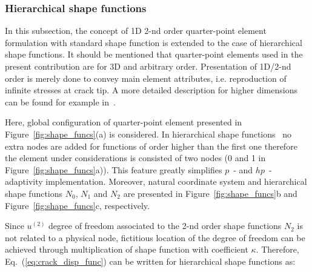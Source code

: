 \documentclass[11pt]{acmeArticle}
\numberwithin{equation}{section}
\begin{document}
\subsubsection{Hierarchical shape functions}
In this subsection, the concept of 1D 2-nd order quarter-point element formulation with standard shape function is extended to the case of hierarchical shape functions.
It should be mentioned that quarter-point elements used in the present contribution are for 3D and arbitrary order.
Presentation of 1D/2-nd order is merely done to convey main element attributes, i.e. reproduction of infinite stresses at crack tip.
A more detailed description for higher dimensions can be found for example in~\citep{nejati2015use}.

Here, global configuration of quarter-point element presented in Figure~\ref{fig:shape_funcs}(a) is considered.
In hierarchical shape functions~\citep{Ainsworth2003} no extra nodes are added for functions of order higher than the first one therefore the element under considerations is consisted of two nodes (0 and 1 in Figure~\ref{fig:shape_funcs}a)). 
This feature greatly simplifies $p$~- and $hp$~- adaptivity implementation.
Moreover, natural coordinate system and hierarchical shape functions $N_0$, $N_1$ and $N_2$ are presented in Figure~\ref{fig:shape_funcs}b and Figure~\ref{fig:shape_funcs}c, respectively.

Since $u^{(2)}$ degree of freedom associated to the 2-nd order shape functions $N_2$ is not related to a physical node, fictitious location of the degree of freedom can be achieved through multiplication of shape function with coefficient $\kappa$. 
Therefore, Eq.~(\ref{eq:crack_disp_func}) can be written for hierarchical shape functions as:
\end{document}
